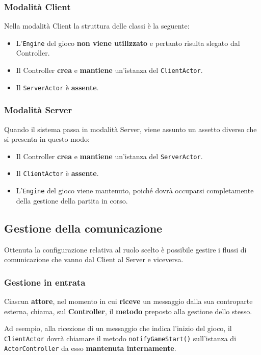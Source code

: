     \subsubsection{Modalità Client}
        Nella modalità Client la struttura delle classi è la seguente:
        \begin{itemize}
            \item L'\texttt{Engine} del gioco \textbf{non viene utilizzato} e pertanto risulta slegato dal Controller.
            \item Il Controller \textbf{crea} e \textbf{mantiene} un'istanza del \texttt{ClientActor}.
            \item Il \texttt{ServerActor} è \textbf{assente}.
        \end{itemize}

    \subsubsection{Modalità Server}
    Quando il sistema passa in modalità Server, viene assunto un assetto diverso che si presenta in questo modo:
        \begin{itemize}
            \item Il Controller \textbf{crea} e \textbf{mantiene} un'istanza del \texttt{ServerActor}.
            \item Il \texttt{ClientActor} è \textbf{assente}.
            \item L'\texttt{Engine} del gioco viene mantenuto, poiché dovrà occuparsi completamente della gestione della partita in corso.
        \end{itemize}    
        
\subsection{Gestione della comunicazione}
Ottenuta la configurazione relativa al ruolo scelto è possibile gestire i flussi di comunicazione che vanno dal Client al Server e viceversa.
    \subsubsection{Gestione in entrata}
    Ciascun \textbf{attore}, nel momento in cui \textbf{riceve} un messaggio dalla sua controparte esterna, chiama, sul \textbf{Controller}, il \textbf{metodo} preposto alla gestione dello stesso.
    
    Ad esempio, alla ricezione di un messaggio che indica l'inizio del gioco, il \texttt{ClientActor} dovrà chiamare il metodo \texttt{notifyGameStart()} sull'istanza di \texttt{ActorController} da esso \textbf{mantenuta internamente}.
    
